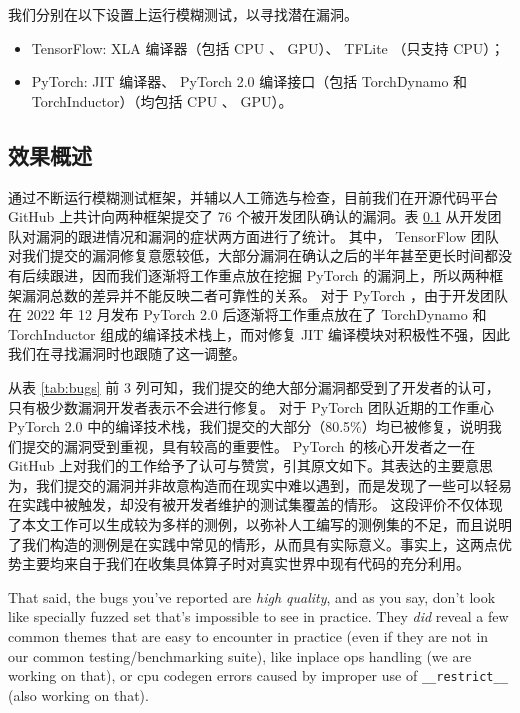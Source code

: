 我们分别在以下设置上运行模糊测试，以寻找潜在漏洞。

\begin{itemize}
    \item TensorFlow: XLA 编译器（包括 CPU 、 GPU）、 TFLite （只支持 CPU）；
    \item PyTorch: JIT 编译器、 PyTorch 2.0 编译接口（包括 TorchDynamo 和 TorchInductor）（均包括 CPU 、 GPU）。
\end{itemize}

\subsection{效果概述}

通过不断运行模糊测试框架，并辅以人工筛选与检查，目前我们在开源代码平台 GitHub 上共计向两种框架提交了 76 个被开发团队确认的漏洞。表 \ref{} 从开发团队对漏洞的跟进情况和漏洞的症状两方面进行了统计。
其中， TensorFlow 团队对我们提交的漏洞修复意愿较低，大部分漏洞在确认之后的半年甚至更长时间都没有后续跟进，因而我们逐渐将工作重点放在挖掘 PyTorch 的漏洞上，所以两种框架漏洞总数的差异并不能反映二者可靠性的关系。
对于 PyTorch ，由于开发团队在 2022 年 12 月发布 PyTorch 2.0 后逐渐将工作重点放在了 TorchDynamo 和 TorchInductor 组成的编译技术栈上，而对修复 JIT 编译模块对积极性不强，因此我们在寻找漏洞时也跟随了这一调整。

从表 \ref{tab:bugs} 前 3 列可知，我们提交的绝大部分漏洞都受到了开发者的认可，只有极少数漏洞开发者表示不会进行修复。
对于 PyTorch 团队近期的工作重心 PyTorch 2.0 中的编译技术栈，我们提交的大部分（80.5\%）均已被修复，说明我们提交的漏洞受到重视，具有较高的重要性。
PyTorch 的核心开发者之一在 GitHub 上对我们的工作给予了认可与赞赏，引其原文\cite{ngimel_comments}如下。其表达的主要意思为，我们提交的漏洞并非故意构造而在现实中难以遇到，而是发现了一些可以轻易在实践中被触发，却没有被开发者维护的测试集覆盖的情形。
这段评价不仅体现了本文工作可以生成较为多样的测例，以弥补人工编写的测例集的不足，而且说明了我们构造的测例是在实践中常见的情形，从而具有实际意义。事实上，这两点优势主要均来自于我们在收集具体算子时对真实世界中现有代码的充分利用。

\begin{shadequote}
\small
That said, the bugs you've reported are \textit{high quality}, and as you say, don't look like specially fuzzed set that's impossible to see in practice. They \textit{did} reveal a few common themes that are easy to encounter in practice (even if they are not in our common testing/benchmarking suite), like inplace ops handling (we are working on that), or cpu codegen errors caused by improper use of \texttt{\_\_restrict\_\_} (also working on that).
\end{shadequote}

